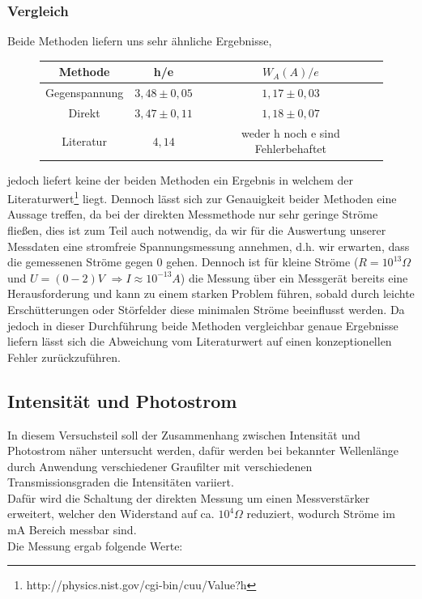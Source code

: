 \documentclass{scrartcl}
\begin{document}
		\subsubsection{Vergleich}
			Beide Methoden liefern uns sehr ähnliche Ergebnisse,
			\begin{figure}[H]
				\centering
				\begin{tabular}{|c|c|c|}
					\hline
					Methode & h/e & $W_A(A)/e$ \\ 
					\hline
					Gegenspannung & $3,48\pm 0,05$ & $1,17\pm 0,03$ \\
					Direkt & $3,47\pm 0,11$ & $1,18\pm 0,07$ \\
					Literatur & $4,14$ & weder h noch e sind Fehlerbehaftet \\
					\hline
				\end{tabular}
			\end{figure}
			jedoch liefert keine der beiden Methoden ein Ergebnis in welchem der Literaturwert\footnote{http://physics.nist.gov/cgi-bin/cuu/Value?h} liegt. Dennoch lässt sich 
			zur Genauigkeit beider Methoden eine Aussage treffen, da bei der direkten Messmethode nur sehr geringe Ströme fließen, dies ist zum Teil auch notwendig,
			da wir für die Auswertung unserer Messdaten eine stromfreie Spannungsmessung annehmen, d.h. wir erwarten, dass die gemessenen Ströme gegen 0 gehen.
			Dennoch ist für kleine Ströme
			($R=10^{13}\Omega$ und $U=(0-2)V$ $\Rightarrow I\approx 10^{-13}A$) die Messung über ein Messgerät bereits eine Herausforderung
			und kann zu einem starken Problem führen, sobald durch leichte Erschütterungen oder Störfelder diese minimalen Ströme beeinflusst werden.
			Da jedoch in dieser Durchführung beide Methoden vergleichbar genaue Ergebnisse liefern lässt sich die Abweichung vom 
			Literaturwert auf einen konzeptionellen Fehler zurückzuführen.

	\subsection{Intensität und Photostrom}
		In diesem Versuchsteil soll der Zusammenhang zwischen Intensität und Photostrom näher untersucht werden, dafür 
		werden bei bekannter Wellenlänge durch Anwendung verschiedener Graufilter mit verschiedenen Transmissionsgraden
		die Intensitäten variiert.\\
		Dafür wird die Schaltung der direkten Messung um einen Messverstärker erweitert, welcher den Widerstand
		auf ca. $10^4 \Omega$ reduziert, wodurch Ströme im mA Bereich messbar sind.\\
		Die Messung ergab folgende Werte:
		
\end{document}
